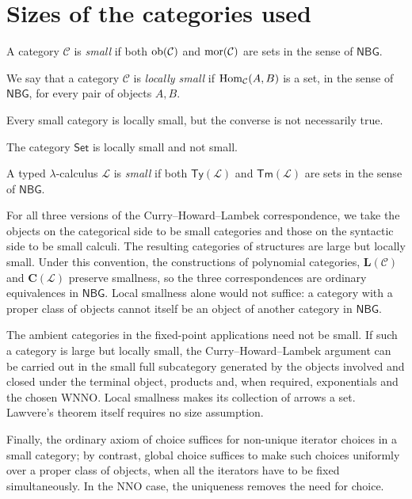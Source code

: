 \section{Sizes of the categories used}

\begin{definition}
    A category $\mathcal C$ is \emph{small} if both $\operatorname{ob}(\mathcal C)$ and $\operatorname{mor}(\mathcal C)$ are sets in the sense of $\mathsf{NBG}$.
\end{definition}

\begin{definition}
    We say that a category $\mathcal C$ is \emph{locally small} if $\operatorname{Hom}_{\mathcal C}(A,B)$ is a set, in the sense of $\mathsf{NBG}$, for every pair of objects $A,B$.
\end{definition}

\begin{remark}
    Every small category is locally small, but the converse is not necessarily true.
\end{remark}

\begin{example}
    The category $\mathsf{Set}$ is locally small and not small.
\end{example}

\begin{definition}
    A typed $\lambda$-calculus $\mathcal L$ is \emph{small} if both $\mathsf{Ty}(\mathcal L)$ and $\mathsf{Tm}(\mathcal L)$ are sets in the sense of $\mathsf{NBG}$.
\end{definition}

For all three versions of the Curry--Howard--Lambek correspondence, we take the objects on the categorical side to be small categories and those on the syntactic side to be small calculi.
The resulting categories of structures are large but locally small. Under this convention, the constructions of polynomial categories, $\mathbf L(\mathcal C)$ and $\mathbf C(\mathcal L)$ preserve smallness, so the three correspondences are ordinary equivalences in $\mathsf{NBG}$.
Local smallness alone would not suffice: a category with a proper class of objects cannot itself be an object of another category in $\mathsf{NBG}$.

The ambient categories in the fixed-point applications need not be small. If such a category is large but locally small, the Curry--Howard--Lambek argument can be carried out in the small full subcategory generated by the objects involved and closed under the terminal object,
products and, when required, exponentials and the chosen WNNO. Local smallness makes its collection of arrows a set. Lawvere's theorem itself requires no size assumption.

Finally, the ordinary axiom of choice suffices for non-unique iterator choices in a small category; by contrast, global choice suffices to make such choices uniformly over a proper class of objects,
when all the iterators have to be fixed simultaneously. In the NNO case, the uniqueness removes the need for choice.
